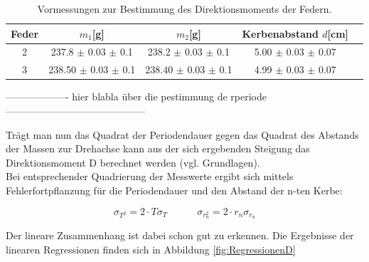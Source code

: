 \documentclass[12pt,a4paper]{article}
\begin{document}
\begin{table}
\caption{Vormessungen zur Bestimmung des Direktionsmoments der Federn.}
\begin{center}
\begin{tabular}{|c|c|c|c|c|}
\hline
Feder & $m_1$[g] & $m_2$[g] & Kerbenabstand $d$[cm]\\
\hline
2 & 237.8 $\pm$ 0.03 $\pm$ 0.1 & 238.2 $\pm$ 0.03 $\pm$ 0.1 & 5.00 $\pm$ 0.03 $\pm$ 0.07 \\
\hline
3 & 238.50 $\pm$ 0.03 $\pm$ 0.1 & 238.40 $\pm$ 0.03 $\pm$ 0.1 & 4.99 $\pm$ 0.03 $\pm$ 0.07\\ 
\hline
\end{tabular}
\end{center}
\label{tab:Vormessungen}
\end{table}

-------------------
hier blabla über die pestimmung de rperiode\\
------------------------------------------

Trägt man nun das Quadrat der Periodendauer gegen das Quadrat des Abstands der Massen zur Drehachse kann aus der sich ergebenden Steigung das Direktionsmoment D berechnet werden (vgl. Grundlagen).\\
Bei entsprechender Quadrierung der Messwerte ergibt sich mittels Fehlerfortpflanzung für die Periodendauer und den Abstand der n-ten Kerbe:

\begin{equation}
\sigma_{T^2}=2\cdot T \sigma_T \quad \quad \quad \sigma_{r_n^2}=2\cdot r_n \sigma_{r_n}
\end{equation}

Der lineare Zusammenhang ist dabei schon gut zu erkennen. Die Ergebnisse der linearen Regressionen finden sich in Abbildung \ref{fig:RegressionenD}
\end{document}
